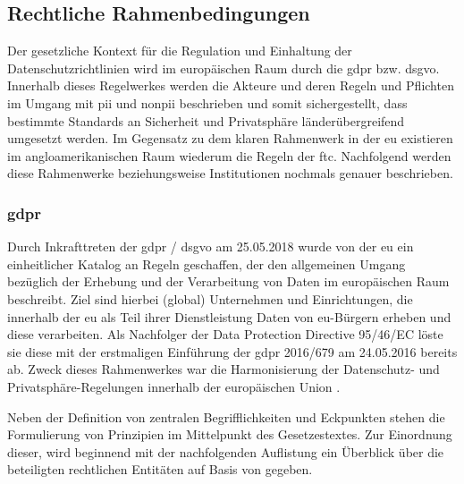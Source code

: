 \subsection{Rechtliche Rahmenbedingungen}
\label{sec:Grundlagen:ssec:Rechtliche Rahmenbedingungen}

Der gesetzliche Kontext für die Regulation und Einhaltung der Datenschutzrichtlinien wird im europäischen Raum durch die \acl{gdpr} bzw. \acl{dsgvo}. Innerhalb dieses Regelwerkes werden die Akteure und deren Regeln und Pflichten im Umgang mit \ac{pii} und \ac{nonpii} beschrieben und somit sichergestellt, dass bestimmte Standards an Sicherheit und Privatsphäre länderübergreifend umgesetzt werden. Im Gegensatz zu dem klaren Rahmenwerk in der \ac{eu} existieren im angloamerikanischen Raum wiederum die Regeln der \acl{ftc}. Nachfolgend werden diese Rahmenwerke beziehungsweise Institutionen nochmals genauer beschrieben.

\subsubsection{\acl{gdpr}}
\label{sec:Grundlagen:ssec:Rechtliche Rahmenbedingungen:sssec:GDPR}

Durch Inkrafttreten der \ac{gdpr} / \ac{dsgvo} am 25.05.2018 wurde von der \acl{eu} ein einheitlicher Katalog an Regeln geschaffen, der den allgemeinen Umgang bezüglich der Erhebung und der Verarbeitung von Daten im europäischen Raum beschreibt. Ziel sind hierbei (global) Unternehmen und Einrichtungen, die innerhalb der \acl{eu} als Teil ihrer Dienstleistung Daten von \ac{eu}-Bürgern erheben und diese verarbeiten. Als Nachfolger der Data Protection Directive 95/46/EC löste sie diese mit der erstmaligen Einführung der \ac{gdpr} 2016/679 am 24.05.2016 bereits ab. Zweck dieses Rahmenwerkes war die Harmonisierung der Datenschutz- und Privatsphäre-Regelungen innerhalb der europäischen Union \cite{Bastos2019}.

Neben der Definition von zentralen Begrifflichkeiten und Eckpunkten stehen die Formulierung von Prinzipien im Mittelpunkt des Gesetzestextes. Zur Einordnung dieser, wird beginnend mit der nachfolgenden Auflistung ein Überblick über die beteiligten rechtlichen Entitäten auf Basis von \cite{DSGVOArt4} gegeben.

